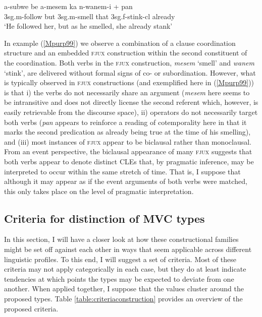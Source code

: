 \ea \label{Mpurp99}
\gll a-subwe be a-mesem ka n-wanem-i + pan \\
\acs{3}\acs{sg}.\acs{m}-follow but \acs{3}\acs{sg}.\acs{m}-smell that \acs{3}\acs{sg}.\acs{f}-stink-\acs{cl} already \\
\glft `He followed her, but as he smelled, she already stank' \\ 
\z
\xe

In example (\ref{Mpurp99}) we observe a combination of a clause coordination structure and an embedded \textsc{fjux} construction within the second constituent of the coordination. Both verbs in the \textsc{fjux} construction, \textit{mesem} `smell' and \textit{wanem} `stink', are delivered without formal signs of co- or subordination. However, what is typically observed in \textsc{fjux} constructions (and exemplified here in (\ref{Mpurp99})) is that i) the verbs do not necessarily share an argument (\textit{mesem} here seems to be intransitive and does not directly license the second referent which, however, is easily retrievable from the discourse space), ii) operators do not necessarily target both verbs (\textit{pan} appears to reinforce a reading of cotemporality here in that it marks the second predication as already being true at the time of his smelling), and (iii) most instances of \textsc{fjux} appear to be biclausal rather than monoclausal. From an event perspective, the biclausal appearance of many \textsc{fjux} suggests that both verbs appear to denote distinct CLEs that, by pragmatic inference, may be interpreted to occur within the same stretch of time. That is, I suppose that although it may appear as if the event arguments of both verbs were matched, this only takes place on the level of pragmatic interpretation.

\subsection{Criteria for distinction of MVC types}\label{sec:criteria_mvcs}

In this section, I will have a closer look at how these constructional families might be set off against each other in ways that seem applicable across different linguistic profiles. To this end, I will suggest a set of criteria. Most of these criteria may not apply categorically in each case, but they do at least indicate tendencies at which points the types may be expected to deviate from one another. When applied together, I suppose that the values cluster around the proposed types. Table \ref{table:criteriaconstruction} provides an overview of the proposed criteria.

